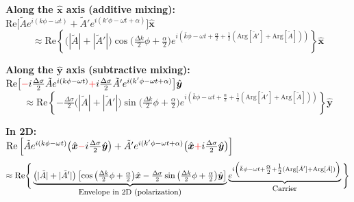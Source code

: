 \noindent
\textbf{Along the $\hat{\boldsymbol{x}}$ axis (additive mixing):} \\[2pt]
\noindent
$\text{Re}\big[ \tilde{A} e^{i(k\phi-\omega t)} + \tilde{A}' e^{i(k'\phi-\omega t+\alpha)} \big] \hat{\boldsymbol{x}}$
\vspace{-0.6em}
\begin{equation*}
\approx \text{Re} \left\{ \big( |\tilde{A}| + |\tilde{A}'| \big) \cos \big( \tfrac{\Delta k}{2} \phi + \tfrac{\alpha}{2} \big) e^{i \left( \bar{k}\phi - \omega t + \tfrac{\alpha}{2} + \tfrac{1}{2} (\text{Arg}[\tilde{A}'] + \text{Arg}[\tilde{A}]) \right)} \right\} \hat{\boldsymbol{x}}
\end{equation*}

\noindent
\textbf{Along the $\hat{\boldsymbol{y}}$ axis (subtractive mixing):} \\[2pt]
\noindent
$\text{Re}\big[ \textcolor{red}{-} i \tfrac{\Delta \sigma}{2} \tilde{A} e^{i(k\phi-\omega t)} \textcolor{red}{+} i \tfrac{\Delta \sigma}{2} \tilde{A}' e^{i(k'\phi-\omega t+\alpha)} \big] \hat{\boldsymbol{y}}$
\vspace{-0.6em}
\begin{equation*}
\approx \text{Re} \left\{ -\tfrac{\Delta \sigma}{2} \big( |\tilde{A}| + |\tilde{A}'| \big) \sin \big( \tfrac{\Delta k}{2} \phi + \tfrac{\alpha}{2} \big) e^{i \left( \bar{k}\phi - \omega t + \tfrac{\alpha}{2} + \tfrac{1}{2} (\text{Arg}[\tilde{A}'] + \text{Arg}[\tilde{A}]) \right)} \right\} \hat{\boldsymbol{y}}
\end{equation*}

\noindent
\textbf{In 2D:} \\[2pt]
\noindent
$\text{Re} \left[ \tilde{A} e^{i(k\phi-\omega t)} \big( \hat{\boldsymbol{x}} \textcolor{red}{-} i \tfrac{\Delta \sigma}{2} \hat{\boldsymbol{y}} \big) + \tilde{A}' e^{i(k'\phi-\omega t+\alpha)} \big( \hat{\boldsymbol{x}} \textcolor{red}{+} i \tfrac{\Delta \sigma}{2} \hat{\boldsymbol{y}} \big) \right]$
\vspace{-0.6em}
\begin{equation*}
\approx \text{Re} \Bigg\{ \underbrace{\big( |\tilde{A}| + |\tilde{A}'| \big) \left[ \cos \big( \tfrac{\Delta k}{2} \phi + \tfrac{\alpha}{2} \big) \hat{\boldsymbol{x}} - \tfrac{\Delta \sigma}{2} \sin \big( \tfrac{\Delta k}{2} \phi + \tfrac{\alpha}{2} \big) \hat{\boldsymbol{y}} \right]}_{\text{\small Envelope in 2D (polarization)}} \underbrace{e^{i \left( \bar{k}\phi - \omega t + \tfrac{\alpha}{2} + \tfrac{1}{2} (\text{Arg}[\tilde{A}'] + \text{Arg}[\tilde{A}]) \right)}}_{\text{\small Carrier}} \Bigg\}
\end{equation*}

